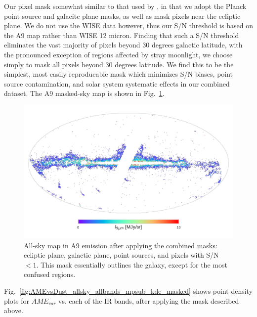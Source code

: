           Our pixel mask somewhat similar to that used by \cite{hensley16}, in that we adopt the Planck point source and galacitc plane masks, as well as mask pixels near the ecliptic plane. We do not use the WISE data however, thus our S/N threshold is based on the A9 map rather than WISE 12 micron. Finding that such a S/N threshold eliminates the vast majority of pixels beyond 30 degrees galactic latitude, with the pronounced exception of regions affected by stray moonlight, we choose simply to mask all pixels beyond 30 degrees latitude. We find this to be the simplest, most easily reproducable mask which minimizes S/N biases, point source contamination, and solar system systematic effects in our combined dataset. The A9 masked-sky map is shown in Fig.~\ref{fig:A9_masked_map}.
          \begin{figure}
            \includegraphics[width=\textwidth]{../Plots/ch_allsky/masked_map_A9.pdf}
            \centering
            \caption{All-sky map in A9 emission after applying the combined masks: ecliptic plane, galactic plane, point sources, and pixels with S/N $<1$. This mask essentially outlines the galaxy, except for the most confused regions.}
            \label{fig:A9_masked_map}
          \end{figure}
           Fig.~\ref{fig:AMEvsDust_allsky_allbands_mpsub_kde_masked} shows point-density plots for $AME_{var}$ vs. each of the IR bands, after applying the mask described above.
